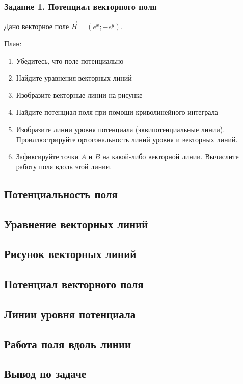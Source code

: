 \begin{frame}\frametitle{Задание 1. Потенциал векторного поля}
	Дано векторное поле \( \vec H = \left( e^x; -e^y \right) \).

	План:
	\begin{enumerate}
		\item Убедитесь, что поле потенциально
		\item Найдите уравнения векторных линий
		\item Изобразите векторные линии на рисунке
		\item Найдите потенциал поля при помощи криволинейного интеграла
		\item Изобразите линии уровня потенциала (эквипотенциальные линии).
		      Проиллюстрируйте ортогональность линий уровня и векторных линий.
		\item Зафиксируйте точки \( A \) и \( B \) на какой-либо векторной линии.
		      Вычислите работу поля вдоль этой линии.
	\end{enumerate}
\end{frame}

\subsection{Потенциальность поля}

\subsection{Уравнение векторных линий}

\subsection{Рисунок векторных линий}

\subsection{Потенциал векторного поля}

\subsection{Линии уровня потенциала}

\subsection{Работа поля вдоль линии}

\subsection{Вывод по задаче}

